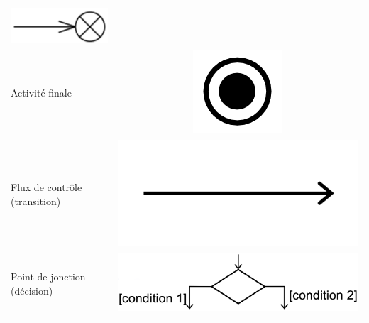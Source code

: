 \begin{table}[H]
\begin{adjustbox}{max width= \textwidth}
\begin{tabular}{l|c}
		\begin{minipage}[r]{0.3\textwidth}
			\centering
			\includegraphics[scale=0.2]{./Images/Diagrammes/diagram_activite_elements_finflux.png}
		\end{minipage}\\
		\cmidrule(lr){1-2}
		Activit\'e finale & 
		\begin{minipage}[r]{0.3\textwidth}
			\centering
			\includegraphics[scale=0.2]{./Images/Diagrammes/diagram_activite_elements_activite_final.png}
		\end{minipage}\\
	\cmidrule(lr){1-2}
	Flux de contr\^ole (transition) & 
	\begin{minipage}{0.2\textwidth}
		\centering
		\includegraphics[width=\textwidth]{./Images/Diagrammes/diagram_activite_elements_fluxcommande.png}
	\end{minipage}\\
\cmidrule(lr){1-2}
Point de jonction (d\'ecision) & 
\begin{minipage}{0.5\textwidth}
	\includegraphics[width=\textwidth]{./Images/Diagrammes/diagram_activite_elements_pointjonction.png}

\end{minipage}
\end{tabular}
\end{adjustbox}
\end{table}
